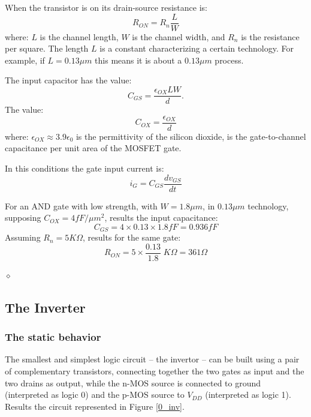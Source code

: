 When the transistor is on its drain-source resistance is:
$$R_{ON} = R_{n}\frac{L}{W}$$
where: $L$ is the channel length, $W$ is the channel width, and $R_{n}$
is the resistance per square. The length $L$ is a constant
characterizing a certain technology. For example, if $L = 0.13\mu m$
this means it is about a $0.13\mu m$ process.

The input capacitor has the value:
$$C_{GS} = \frac{\epsilon_{OX} LW}{d}.$$
The value:
$$C_{OX} = \frac{\epsilon_{OX}}{d}$$
where: $\epsilon_{OX} \approx 3.9 \epsilon_{0}$ is the permittivity of
the silicon dioxide, is  the gate-to-channel capacitance per unit area
of the MOSFET gate.

In this conditions the gate input current is:
$$i_{G} = C_{GS} \frac{dv_{GS}}{dt}$$



\begin{exemplu}
For an AND gate with low strength, with $W = 1.8\mu m$, in $0.13
\mu m$ technology, supposing $C_{OX} = 4fF/\mu m^{2}$, results the
input capacitance: $$C_{GS} = 4 \times 0.13 \times 1.8 fF = 0.936
fF$$ Assuming $R_{n} = 5K\Omega$, results for the same gate:
$$R_{ON} = 5 \times \frac{0.13}{1.8} \; K\Omega = 361 \Omega$$

$\diamond$
\end{exemplu}

\subsection{The Inverter}


\subsubsection{The static behavior}

The smallest and simplest logic circuit -- the invertor -- can be built
using a pair of complementary transistors, connecting together the two
gates as input and the two drains as output, while the n-MOS source is
connected to ground (interpreted as logic 0) and the p-MOS source to
$V_{DD}$ (interpreted as logic 1). Results the circuit represented in
Figure \ref{0_inv}.



